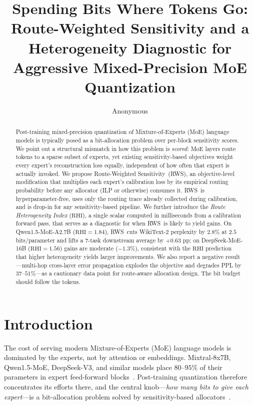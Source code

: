 \documentclass{article}
\title{Spending Bits Where Tokens Go:\\ Route-Weighted Sensitivity and a Heterogeneity Diagnostic for Aggressive Mixed-Precision MoE Quantization}
\author{Anonymous}
\date{}
\newcommand{\method}{\textsc{RWS}\xspace}
\newcommand{\longmethod}{Route-Weighted Sensitivity\xspace}
\newcommand{\rhi}{\mathrm{RHI}}
\begin{document}
\maketitle

\begin{abstract}
Post-training mixed-precision quantization of Mixture-of-Experts (MoE) language models is typically posed as a bit-allocation problem over per-block sensitivity scores. We point out a structural mismatch in how this problem is \emph{scored}: MoE layers route tokens to a sparse subset of experts, yet existing sensitivity-based objectives weight every expert's reconstruction loss equally, independent of how often that expert is actually invoked. We propose \longmethod\ (\method), an objective-level modification that multiplies each expert's calibration loss by its empirical routing probability before any allocator (ILP or otherwise) consumes it. \method\ is hyperparameter-free, uses only the routing trace already collected during calibration, and is drop-in for any sensitivity-based pipeline. We further introduce the \emph{Route Heterogeneity Index} ($\rhi$), a single scalar computed in milliseconds from a calibration forward pass, that serves as a diagnostic for when \method\ is likely to yield gains. On Qwen1.5-MoE-A2.7B ($\rhi = 1.84$), \method\ cuts WikiText-2 perplexity by $2.8\%$ at $2.5$ bits/parameter and lifts a 7-task downstream average by $+0.63$ pp; on DeepSeek-MoE-16B ($\rhi = 1.56$) gains are moderate ($-1.3\%$), consistent with the $\rhi$ prediction that higher heterogeneity yields larger improvements. We also report a negative result---multi-hop cross-layer error propagation explodes the objective and degrades PPL by $37$--$51\%$---as a cautionary data point for route-aware allocation design. The bit budget should follow the tokens.
\end{abstract}

\section{Introduction}
\label{sec:intro}

The cost of serving modern Mixture-of-Experts (MoE) language models is dominated by the experts, not by attention or embeddings. Mixtral-8x7B, Qwen1.5-MoE, DeepSeek-V3, and similar models place $80$--$95\%$ of their parameters in expert feed-forward blocks~\citep{jiang2024mixtral, bai2023qwen, deepseekv3}. Post-training quantization therefore concentrates its efforts there, and the central knob---\emph{how many bits to give each expert}---is a bit-allocation problem solved by sensitivity-based allocators~\citep{wang2025mxmoe, zhang2024optimizing, xi2024mixed, ding2024qmoe}.
\end{document}
